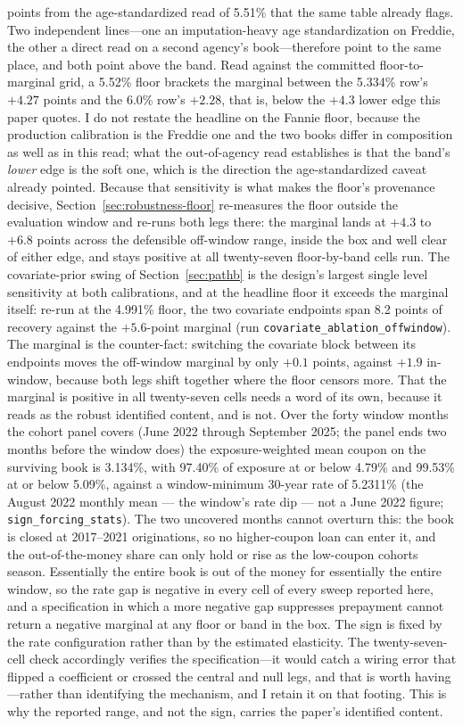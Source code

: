 \documentclass[12pt]{article}
\begin{document}
points from the age-standardized read of 5.51\% that the same table already flags. Two independent lines---one an imputation-heavy age standardization on Freddie, the other a direct read on a second agency's book---therefore point to the same place, and both point above the band. Read against the committed floor-to-marginal grid, a 5.52\% floor brackets the marginal between the 5.334\% row's $+4.27$ points and the 6.0\% row's $+2.28$, that is, below the $+4.3$ lower edge this paper quotes. I do not restate the headline on the Fannie floor, because the production calibration is the Freddie one and the two books differ in composition as well as in this read; what the out-of-agency read establishes is that the band's \emph{lower} edge is the soft one, which is the direction the age-standardized caveat already pointed. Because that sensitivity is what makes the floor's provenance decisive, Section~\ref{sec:robustness-floor} re-measures the floor outside the evaluation window and re-runs both legs there: the marginal lands at $+4.3$ to $+6.8$ points across the defensible off-window range, inside the box and well clear of either edge, and stays positive at all twenty-seven floor-by-band cells run. The covariate-prior swing of Section~\ref{sec:pathb} is the design's largest single level sensitivity at both calibrations, and at the headline floor it exceeds the marginal itself: re-run at the 4.991\% floor, the two covariate endpoints span 8.2 points of recovery against the $+5.6$-point marginal (run \texttt{covariate\_ablation\_offwindow}). The marginal is the counter-fact: switching the covariate block between its endpoints moves the off-window marginal by only $+0.1$ points, against $+1.9$ in-window, because both legs shift together where the floor censors more. That the marginal is positive in all twenty-seven cells needs a word of its own, because it reads as the robust identified content, and is not. Over the forty window months the cohort panel covers (June 2022 through September 2025; the panel ends two months before the window does) the exposure-weighted mean coupon on the surviving book is 3.134\%, with 97.40\% of exposure at or below 4.79\% and 99.53\% at or below 5.09\%, against a window-minimum 30-year rate of 5.2311\% (the August 2022 monthly mean --- the window's rate dip --- not a June 2022 figure; \texttt{sign\_forcing\_stats}). The two uncovered months cannot overturn this: the book is closed at 2017--2021 originations, so no higher-coupon loan can enter it, and the out-of-the-money share can only hold or rise as the low-coupon cohorts season. Essentially the entire book is out of the money for essentially the entire window, so the rate gap is negative in every cell of every sweep reported here, and a specification in which a more negative gap suppresses prepayment cannot return a negative marginal at any floor or band in the box. The sign is fixed by the rate configuration rather than by the estimated elasticity. The twenty-seven-cell check accordingly verifies the specification---it would catch a wiring error that flipped a coefficient or crossed the central and null legs, and that is worth having---rather than identifying the mechanism, and I retain it on that footing. This is why the reported range, and not the sign, carries the paper's identified content. 
\end{document}
